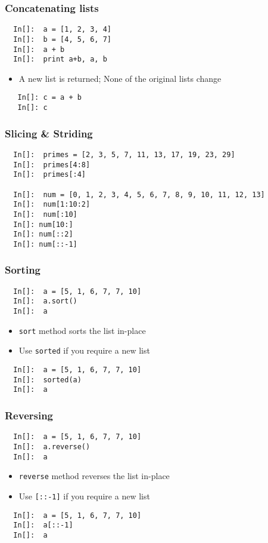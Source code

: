 \begin{frame}[fragile]
  \frametitle{Concatenating lists}
  \begin{lstlisting}
  In[]:  a = [1, 2, 3, 4]
  In[]:  b = [4, 5, 6, 7]
  In[]:  a + b
  In[]:  print a+b, a, b
  \end{lstlisting}
  \begin{itemize}
  \item A new list is returned; None of the original lists change
  \end{itemize}
  \begin{lstlisting}
   In[]: c = a + b
   In[]: c
  \end{lstlisting}
\end{frame}

\begin{frame}[fragile]
  \frametitle{Slicing \& Striding}
  \begin{lstlisting}
  In[]:  primes = [2, 3, 5, 7, 11, 13, 17, 19, 23, 29]
  In[]:  primes[4:8]
  In[]:  primes[:4]

  In[]:  num = [0, 1, 2, 3, 4, 5, 6, 7, 8, 9, 10, 11, 12, 13]
  In[]:  num[1:10:2]
  In[]:  num[:10]
  In[]: num[10:]
  In[]: num[::2]
  In[]: num[::-1]
  \end{lstlisting}
\end{frame}

\begin{frame}[fragile]
  \frametitle{Sorting}
  \begin{lstlisting}
  In[]:  a = [5, 1, 6, 7, 7, 10]
  In[]:  a.sort()
  In[]:  a
  \end{lstlisting}
  \begin{itemize}
  \item \texttt{sort} method sorts the list in-place
  \item Use \texttt{sorted} if you require a new list
  \end{itemize}
  \begin{lstlisting}
  In[]:  a = [5, 1, 6, 7, 7, 10]
  In[]:  sorted(a)
  In[]:  a
  \end{lstlisting}
\end{frame}

\begin{frame}[fragile]
  \frametitle{Reversing}
  \begin{lstlisting}
  In[]:  a = [5, 1, 6, 7, 7, 10]
  In[]:  a.reverse()
  In[]:  a
  \end{lstlisting}
  \begin{itemize}
  \item \texttt{reverse} method reverses the list in-place
  \item Use \texttt{[::-1]} if you require a new list
  \end{itemize}
  \begin{lstlisting}
  In[]:  a = [5, 1, 6, 7, 7, 10]
  In[]:  a[::-1]
  In[]:  a
  \end{lstlisting}
\end{frame}
